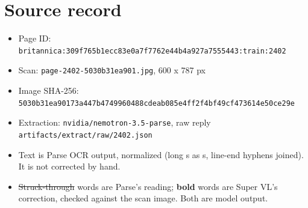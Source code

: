\documentclass[10pt]{article}
\begin{document}
\section*{Source record}
\begin{itemize}
\item Page ID: \texttt{britannica:309f765b1ecc83e0a7f7762e44b4a927a7555443:train:2402}
\item Scan: \texttt{page-2402-5030b31ea901.jpg}, 600 x 787 px
\item Image SHA-256: \texttt{\small 5030b31ea90173a447b4749960488cdeab085e4ff2f4bf49cf473614e50ce29e}
\item Extraction: \texttt{nvidia/nemotron-3.5-parse}, raw reply \texttt{artifacts/extract/raw/2402.json}
\item Text is Parse OCR output, normalized (long s as s, line-end hyphens joined). It is not corrected by hand.
\item \sout{Struck-through} words are Parse's reading; \textbf{bold} words are Super VL's correction, checked against the scan image. Both are model output.
\end{itemize}
\end{document}
